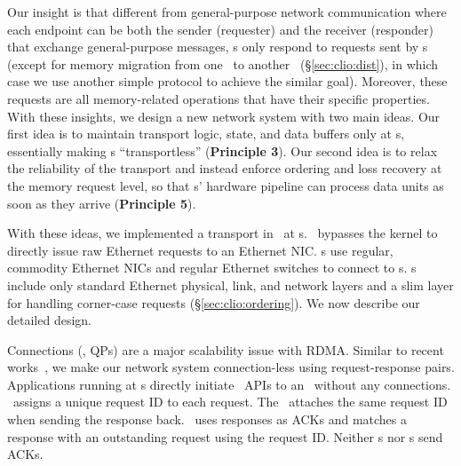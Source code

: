 Our insight is that different from general-purpose network communication where each endpoint can be both the sender (requester) and the receiver (responder) that exchange general-purpose messages,
\MN{}s only respond to requests sent by \CN{}s (except for memory migration from one \MN\ to another \MN\ (\S\ref{sec:clio:dist}), in which case we use another simple protocol to achieve the similar goal).
Moreover, these requests are all memory-related operations that have their specific properties.
With these insights, we design a new network system with two main ideas.
Our first idea is to maintain transport logic, state, and data buffers only at \CN{}s,
essentially making \MN{}s ``transportless'' (\textbf{Principle 3}). 
Our second idea is to relax the reliability of the transport and instead enforce ordering and loss recovery at the memory request level, so that \MN{}s' hardware pipeline can process data units as soon as they arrive (\textbf{Principle 5}).

With these ideas, we implemented a transport in \syslib\ at \CN{}s. \syslib\ bypasses the kernel to directly issue raw Ethernet requests to an Ethernet NIC.
\CN{}s use regular, commodity Ethernet NICs and regular Ethernet switches to connect to \MN{}s.
\MN{}s include only standard Ethernet physical, link, and network layers and a slim layer for handling corner-case requests (\S\ref{sec:clio:ordering}).
We now describe our detailed design.


Connections (\ie, QPs) are a major scalability issue with RDMA.
Similar to recent works~\cite{Homa,1RMA}, we make our network system connection-less using request-response pairs.
Applications running at \CN{}s directly initiate \sys\ APIs to an \MN\ without any connections.
\syslib\ assigns a unique request ID to each request. The \MN\ attaches the same request ID when sending the response back. \syslib\ uses responses as ACKs and matches a response with an outstanding request using the request ID.
Neither \CN{}s nor \MN{}s send ACKs.

